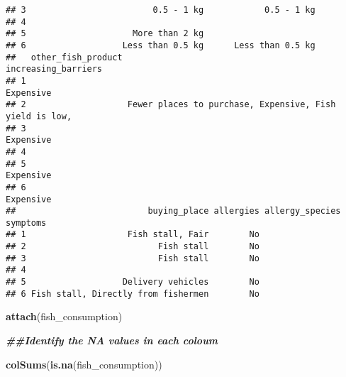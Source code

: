 \documentclass[
]{article}
\newenvironment{Shaded}{\begin{snugshade}}{\end{snugshade}}
\newcommand{\DocumentationTok}[1]{\textcolor[rgb]{0.56,0.35,0.01}{\textbf{\textit{#1}}}}
\newcommand{\FunctionTok}[1]{\textcolor[rgb]{0.13,0.29,0.53}{\textbf{#1}}}
\newcommand{\NormalTok}[1]{#1}
\begin{document}
\begin{verbatim}
## 3                         0.5 - 1 kg            0.5 - 1 kg                
## 4                                                                         
## 5                     More than 2 kg                                      
## 6                   Less than 0.5 kg      Less than 0.5 kg                
##   other_fish_product                                      increasing_barriers
## 1                                                                   Expensive
## 2                    Fewer places to purchase, Expensive, Fish yield is low, 
## 3                                                                   Expensive
## 4                                                                            
## 5                                                                   Expensive
## 6                                                                   Expensive
##                          buying_place allergies allergy_species symptoms
## 1                    Fish stall, Fair        No                         
## 2                          Fish stall        No                         
## 3                          Fish stall        No                         
## 4                                                                       
## 5                   Delivery vehicles        No                         
## 6 Fish stall, Directly from fishermen        No
\end{verbatim}

\begin{Shaded}
\begin{Highlighting}[]
\FunctionTok{attach}\NormalTok{(fish\_consumption)}
\end{Highlighting}
\end{Shaded}

\begin{Shaded}
\begin{Highlighting}[]
\DocumentationTok{\#\#Identify the NA values in each coloum}

\FunctionTok{colSums}\NormalTok{(}\FunctionTok{is.na}\NormalTok{(fish\_consumption))}
\end{Highlighting}
\end{Shaded}
\end{document}
